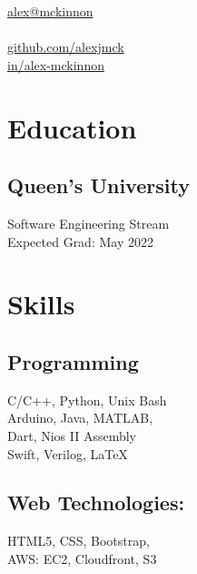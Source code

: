 \documentclass[]{hieudo-build}
\begin{document}
%
%
{
	\faEnvelope \href{mailto:alex@mckinnon.io}{ alex@mckinnon}\\
	 \\
	\faGithub \href{https://github.com/alexjmck}{   github.com/alexjmck}\\
	\faLinkedinSquare \href{https://www.linkedin.com/in/alex-mckinnon}{   in/alex-mckinnon}
}
    
%
%
\begin{minipage}[t]{0.3\textwidth} 

\section{Education} 

\subsection{Queen's University}
Software Engineering Stream \\
Expected Grad: May 2022 \\
\sectionsep

\section{Skills}
\subsection{Programming}
C/C++, Python, Unix Bash\\ 
Arduino, Java, MATLAB, \\ 
Dart, Nios II Assembly\\ 
Swift, Verilog, \LaTeX

\subsection{Web Technologies:}
HTML5, CSS, Bootstrap, \\
AWS: EC2, Cloudfront, S3 \\


\end{minipage}
\end{document}
